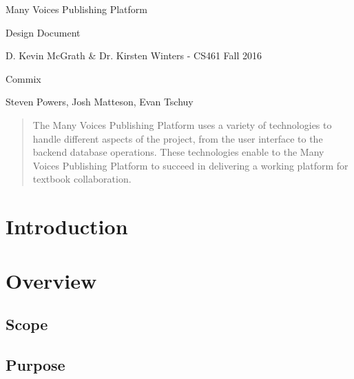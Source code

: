\documentclass[letterpaper, 10pt, draftclsnofoot, compsoc, onecolumn]{IEEEtran}
\begin{document}
\begin{titlepage}
\centering
{\huge Many Voices Publishing Platform\par}
{\LARGE Design Document\par}
{\vspace{5mm}}
{\large D. Kevin McGrath \& Dr. Kirsten Winters -  CS461 Fall 2016\par}
{\large Commix\par}
{\large Steven Powers, Josh Matteson, Evan Tschuy\par}
{\vspace{10mm}}

\begin{abstract}
\noindent The Many Voices Publishing Platform uses a variety of technologies to handle different aspects of the project, from the user interface to the backend database operations. These technologies enable to the Many Voices Publishing Platform to succeed in delivering a working platform for textbook collaboration.
\end{abstract}

\end{titlepage}

\tableofcontents

\newpage

\setcounter{page}{1}\pagestyle{fancy}



\vspace{1pc}
\section{Introduction}


\vspace{1pc}
\section{Overview}

\vspace{1pc}
\subsection{Scope}
\vspace{1pc}

{\noindent \par}

\vspace{1pc}
\subsection{Purpose}
\vspace{1pc}
{\noindent \par}
\end{document}
